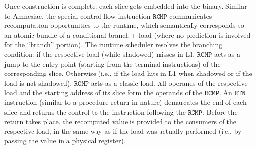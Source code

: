 Once construction is complete, 
each slice gets embedded into the binary. 
Similar to Amnesiac, the special control
flow instruction $\texttt{RCMP}$ communicates recomputation opportunities to the runtime, which
semantically corresponds to an atomic bundle of a conditional branch + load (where no prediction is involved for the ``branch'' portion).
The runtime scheduler resolves the branching condition: if the respective load (while shadowed) misses in L1, $\texttt{RCMP}$ acts as a jump to the entry point (starting from the
terminal instructions) of the corresponding slice. Otherwise (i.e., if the load hits in L1 when shadowed or if the load is not shadowed), $\texttt{RCMP}$ acts as %
a classic load.
All operands of the respective load and the starting address of its slice form the operands of the $\texttt{RCMP}$. 
An $\texttt{RTN}$ instruction (similar to a procedure return in nature) demarcates the end of each slice and returns the control to the instruction following the $\texttt{RCMP}$. Before the return takes place, the recomputed value is provided to the consumers of the respective load, in the same way as if the load was actually performed (i.e., by passing the value in a physical register). 


